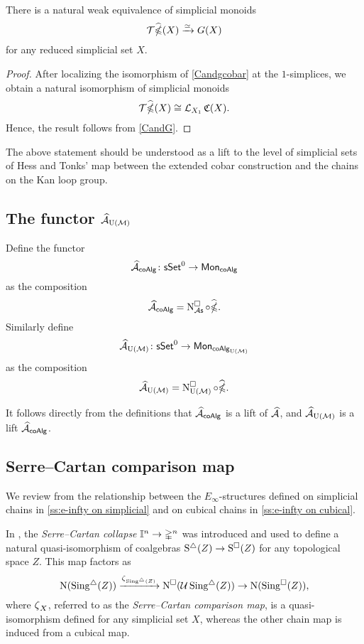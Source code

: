 \begin{corollary} \label{widehatgcobarandG}
	There is a natural weak equivalence of simplicial monoids
	\begin{equation*}
	\mathcal{T} \widehat{\operatorname{\mathbb{\Omega}}}(X) \xrightarrow{\simeq} G(X)
	\end{equation*}
	for any reduced simplicial set $X$.
\end{corollary}

\begin{proof}
	After localizing the isomorphism of \cref{Candgcobar} at the $1$-simplices, we obtain a natural isomorphism of simplicial monoids
	$$\mathcal{T} \widehat{\operatorname{\mathbb{\Omega}}}(X) \cong \mathcal{L}_{X_1}\operatorname{\mathfrak{C}}(X).$$
	Hence, the result follows from \cref{CandG}.
\end{proof}

The above statement should be understood as a lift to the level of simplicial sets of Hess and Tonks' map between the extended cobar construction and the chains on the Kan loop group.

\subsection{The functor $\operatorname{\mathcal{\widehat{A}}}_{{\operatorname{U}(\mathcal{M})}}$} \label{s:ahatum}

Define the functor
$$\operatorname{\mathcal{\widehat{A}}}_{\mathsf{coAlg}} \colon \mathsf{sSet}^0 \to \mathsf{Mon}_{\mathsf{coAlg}}$$
as the composition
$$\operatorname{\mathcal{\widehat{A}}}_{\mathsf{coAlg}} = \operatorname{N^{\square}_{{\mathcal{A}\mathsf{s}}}} \circ \widehat{\operatorname{\mathbb{\Omega}}}.$$
Similarly define
$$\operatorname{\mathcal{\widehat{A}}}_{{\operatorname{U}(\mathcal{M})}} \colon \mathsf{sSet}^0 \to \mathsf{Mon}_{\mathsf{coAlg}_{{\operatorname{U}(\mathcal{M})}}}$$
as the composition
$$\operatorname{\mathcal{\widehat{A}}}_{{\operatorname{U}(\mathcal{M})}} = \operatorname{N^{\square}_{{\operatorname{U}(\mathcal{M})}}} \circ \widehat{\operatorname{\mathbb{\Omega}}}.$$

It follows directly from the definitions that $\operatorname{\mathcal{\widehat{A}}}_{\mathsf{coAlg}}$ is a lift of $\operatorname{\mathcal{\widehat{A}}}$, and $\operatorname{\mathcal{\widehat{A}}}_{{\operatorname{U}(\mathcal{M})}}$ is a lift $\operatorname{\mathcal{\widehat{A}}}_{\mathsf{coAlg}}$.

\subsection{Serre--Cartan comparison map}

We review from \cite{medina2021cubical} the relationship between the $E_\infty$-structures defined on simplicial chains in \cref{ss:e-infty on simplicial} and on cubical chains in \cref{ss:e-infty on cubical}.

In \cite[sect]{serre1951homologie}, the \textit{Serre--Cartan collapse} $\mathbb{I}^n \to \mathbb{\Delta}^n$ was introduced and used to define a natural quasi-isomorphism of coalgebras $\operatorname{S^{\triangle}}(Z) \to \operatorname{S^{\square}}(Z)$ for any topological space $Z$.
This map factors as
\begin{equation*}
\operatorname{N}(\operatorname{Sing^{\triangle}}(Z)) \xrightarrow{\operatorname{\zeta}_{\operatorname{Sing^{\triangle}}(Z)}}
\operatorname{N^{\square}}(\mathcal{U} \operatorname{Sing^{\triangle}}(Z)) \to
\operatorname{N}(\operatorname{Sing^{\square}}(Z)),
\end{equation*}
where $\operatorname{\zeta}_X$, referred to as the \textit{Serre--Cartan comparison map}, is a quasi-isomorphism defined for any simplicial set $X$, whereas the other chain map is induced from a cubical map.

